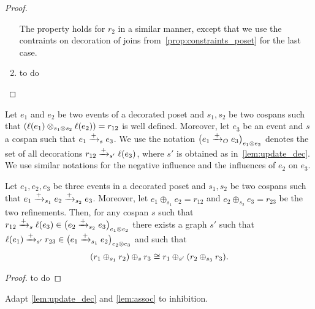 \begin{proof}
\begin{enumerate}
    The property holds for $r_2$ in a similar manner, except that we use the contraints on decoration of joins from~\autoref{prop:constraints_poset} for the last case.

  \item
    \begin{mdframed}[backgroundcolor=blue!20]
      to do
    \end{mdframed}
  \end{enumerate}
\end{proof}

  Let $e_1$ and $e_2$ be two events of a decorated poset and $s_1,s_2$ be two cospans such that $(\ell(e_1)\otimes_{s_1\otimes s_2} \ell(e_2)) = r_{12}$ is well defined. Moreover, let $e_3$ be an event and $s$ a cospan such that $e_1\mathrel{\xrightarrow{+}}_s e_3$. We use the notation $\big(e_1\mathrel{\xrightarrow{+}}_O e_3\big)_{e_1\otimes e_2}$ denotes the set of all decorations $r_{12}\mathrel{\xrightarrow{+}}_{s'} \ell(e_3)$, where $s'$ is obtained as in~\autoref{lem:update_dec}. We use similar notations for the negative influence and the influences of $e_2$ on $e_3$.

\begin{lemma}
  \label{lem:assoc}
   Let $e_1,e_2,e_3$ be three events in a decorated poset and $s_1,s_2$ be two cospans such that $e_1\mathrel{\xrightarrow{+}}_{s_1} e_2\mathrel{\xrightarrow{+}}_{s_2} e_3$.
   Moreover, let $e_1\oplus_{s_1} e_2 = r_{12}$ and $e_2\oplus_{s_2} e_3 = r_{23}$ be the two refinements.
   Then, for any cospan $s$ such that
   $r_{12}\mathrel{\xrightarrow{+}}_{s} \ell(e_3)\in\big(e_2\mathrel{\xrightarrow{+}}_{s_2} e_3\big)_{e_1\otimes e_2}$ there exists a graph $s'$ such that
   $\ell(e_{1})\mathrel{\xrightarrow{+}}_{s'} r_{23}\in\big(e_1\mathrel{\xrightarrow{+}}_{s_1} e_2\big)_{e_2\otimes e_3}$ and such that
   \begin{align*}
     (r_1\oplus_{s_1} r_2)\oplus_{s} r_3 \cong r_1\oplus_{s'} (r_2\oplus_{s_3} r_3).
   \end{align*}
\end{lemma}
\begin{mdframed}[backgroundcolor=blue!20]
  \begin{proof}
    to do
  \end{proof}
\end{mdframed}

\begin{mdframed}[backgroundcolor=blue!20]
Adapt \autoref{lem:update_dec} and \autoref{lem:assoc} to inhibition.
\end{mdframed}


